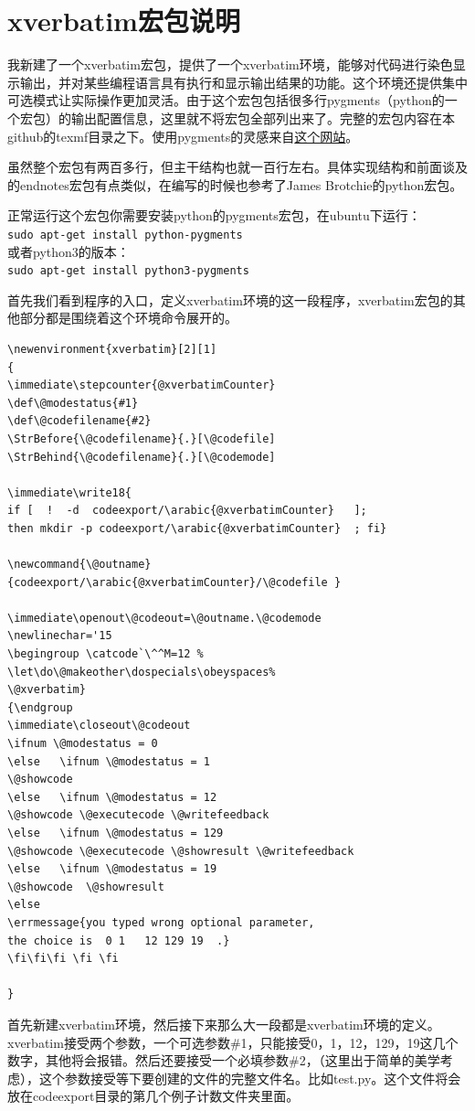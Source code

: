 \documentclass[11pt,oneside]{book}
\begin{document}
\section{xverbatim宏包说明}
我新建了一个xverbatim宏包，提供了一个xverbatim环境，能够对代码进行染色显示输出，并对某些编程语言具有执行和显示输出结果的功能。这个环境还提供集中可选模式让实际操作更加灵活。由于这个宏包包括很多行pygments（python的一个宏包）的输出配置信息，这里就不将宏包全部列出来了。完整的宏包内容在本github的texmf目录之下。使用pygments的灵感来自\href{http://scott.sherrillmix.com/blog/programmer/displaying-code-in-latex/}{这个网站}。

虽然整个宏包有两百多行，但主干结构也就一百行左右。具体实现结构和前面谈及的endnotes宏包有点类似，在编写的时候也参考了James Brotchie的python宏包。

正常运行这个宏包你需要安装python的pygments宏包，在ubuntu下运行：\\
\verb+sudo apt-get install python-pygments+\\
或者python3的版本：\\
\verb+sudo apt-get install python3-pygments+

首先我们看到程序的入口，定义xverbatim环境的这一段程序，xverbatim宏包的其他部分都是围绕着这个环境命令展开的。
\begin{Verbatim}
\newenvironment{xverbatim}[2][1]
{
\immediate\stepcounter{@xverbatimCounter}
\def\@modestatus{#1}
\def\@codefilename{#2}
\StrBefore{\@codefilename}{.}[\@codefile]
\StrBehind{\@codefilename}{.}[\@codemode]

\immediate\write18{
if [  !  -d  codeexport/\arabic{@xverbatimCounter}   ];
then mkdir -p codeexport/\arabic{@xverbatimCounter}  ; fi}

\newcommand{\@outname}
{codeexport/\arabic{@xverbatimCounter}/\@codefile }

\immediate\openout\@codeout=\@outname.\@codemode
\newlinechar='15
\begingroup \catcode`\^^M=12 %
\let\do\@makeother\dospecials\obeyspaces%
\@xverbatim}
{\endgroup
\immediate\closeout\@codeout
\ifnum \@modestatus = 0
\else   \ifnum \@modestatus = 1    
\@showcode
\else   \ifnum \@modestatus = 12   
\@showcode \@executecode \@writefeedback
\else   \ifnum \@modestatus = 129   
\@showcode \@executecode \@showresult \@writefeedback
\else   \ifnum \@modestatus = 19  
\@showcode  \@showresult
\else    
\errmessage{you typed wrong optional parameter,
the choice is  0 1   12 129 19  .}
\fi\fi\fi \fi \fi

}
\end{Verbatim}
首先新建xverbatim环境，然后接下来那么大一段都是xverbatim环境的定义。xverbatim接受两个参数，一个可选参数\#{}1，只能接受0，1，12，129，19这几个数字，其他将会报错。然后还要接受一个必填参数\#{}2，（这里出于简单的美学考虑），这个参数接受等下要创建的文件的完整文件名。比如test.py。这个文件将会放在codeexport目录的第几个例子计数文件夹里面。
\end{document}
